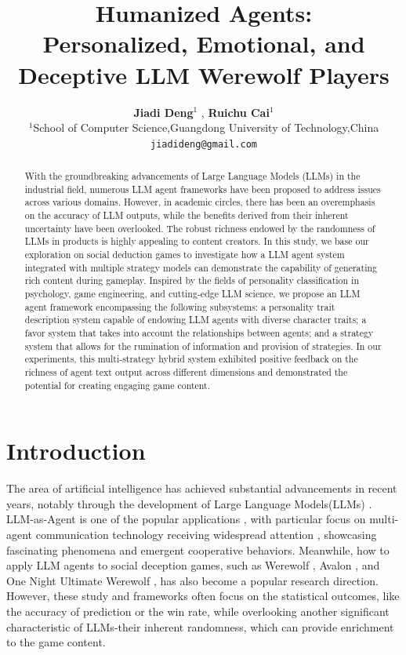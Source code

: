 \documentclass[11pt]{article}
\title{Humanized Agents: \\ Personalized, Emotional, and Deceptive LLM Werewolf Players}
\author{ \textbf{Jiadi Deng}$^{1}$ ,  \textbf{Ruichu Cai}$^{1}$ \\
$^{1}$School of  Computer Science,Guangdong University of Technology,China \\
  \texttt{jiadideng@gmail.com}
  }
\begin{document}
\maketitle
\begin{abstract}
  With the groundbreaking advancements of Large Language Models (LLMs) in the industrial field, numerous LLM agent frameworks have been proposed to address issues across various domains. However, in academic circles, there has been an overemphasis on the accuracy of LLM outputs, while the benefits derived from their inherent uncertainty have been overlooked. The robust richness endowed by the randomness of LLMs in products is highly appealing to content creators. In this study, we base our exploration on social deduction games to investigate how a LLM agent system integrated with multiple strategy models can demonstrate the capability of generating rich content during gameplay. Inspired by the fields of personality classification in psychology, game engineering, and cutting-edge LLM science, we propose an LLM agent framework encompassing the following subsystems: a personality trait description system capable of endowing LLM agents with diverse character traits; a favor system that takes into account the relationships between agents; and a strategy system that allows for the rumination of information and provision of strategies. In our experiments, this multi-strategy hybrid system exhibited positive feedback on the richness of agent text output across different dimensions and demonstrated the potential for creating engaging game content.

\end{abstract}

\section{Introduction}
\label{sec:intro}

The area of artificial intelligence has achieved substantial advancements in recent years, notably through the development of Large Language Models(LLMs) \cite{achiam2023gpt,meta2022human,ouyang2022training} . LLM-as-Agent is one of the popular applications \citep{yao2022react,zhu2023ghost,zhao2024expel}, with particular focus on multi-agent communication technology receiving widespread attention \citep{qian2023communicative,li2023camel,wang2023avalon}, showcasing fascinating phenomena and emergent cooperative behaviors. Meanwhile, how to apply LLM agents to social deception games, such as Werewolf \citep{xu2023exploring,wu2024enhance}, Avalon \citep{wang2023avalon,light2023avalonbench}, and One Night Ultimate Werewolf \citep{jin2024learning}, has also become a popular research direction. However, these study and frameworks often focus on the statistical outcomes, like the accuracy of prediction or the win rate, while overlooking another significant characteristic of LLMs-their inherent randomness, which can provide enrichment to the game content.
\end{document}
